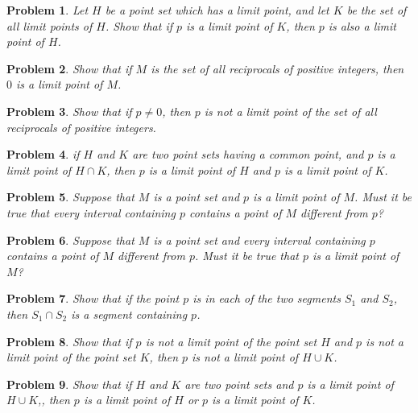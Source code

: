 \documentclass{article}
\newtheorem{problem}{Problem}
\begin{document}
\begin{problem}
Let $H$ be a point set which has a limit point, and let $K$ be the set of all limit points of $H$. Show that if $p$ is a limit point of $K$, then $p$ is also a limit point of $H$.
\end{problem}

\begin{problem}
Show that if $M$ is the set of all reciprocals of positive integers, then $0$ is a limit point of $M$.
\end{problem}

\begin{problem}
Show that if $p \neq 0$, then $p$ is not a limit point of the set of all reciprocals of positive integers.
\end{problem}

\begin{problem}
if $H$ and $K$ are two point sets having a common point, and $p$ is a limit point of $H \cap K$, then $p$ is a limit point of $H$ and $p$ is a limit point of $K$.
\end{problem}

\begin{problem}
Suppose that $M$ is a point set and $p$ is a limit point of $M$. Must it be true that every interval containing $p$ contains a point of $M$ different from $p$?
\end{problem}

\begin{problem}
Suppose that $M$ is a point set and every interval containing $p$ contains a point of $M$ different from $p$. Must it be true that $p$ is a limit point of $M$?
\end{problem}

\begin{problem}
Show that if the point $p$ is in each of the two segments $S_1$ and $S_2$, then $S_1 \cap S_2$ is a segment containing $p$.
\end{problem}

\begin{problem}
Show that if $p$ is not a limit point of the point set $H$ and $p$ is not a limit point of the point set $K$, then $p$ is not a limit point of $H \cup K$.
\end{problem}

\begin{problem}
Show that if $H$ and $K$ are two point sets and $p$ is a limit point of $H \cup K$,, then $p$ is a limit point of $H$ or $p$ is a limit point of $K$.
\end{problem}
\end{document}
